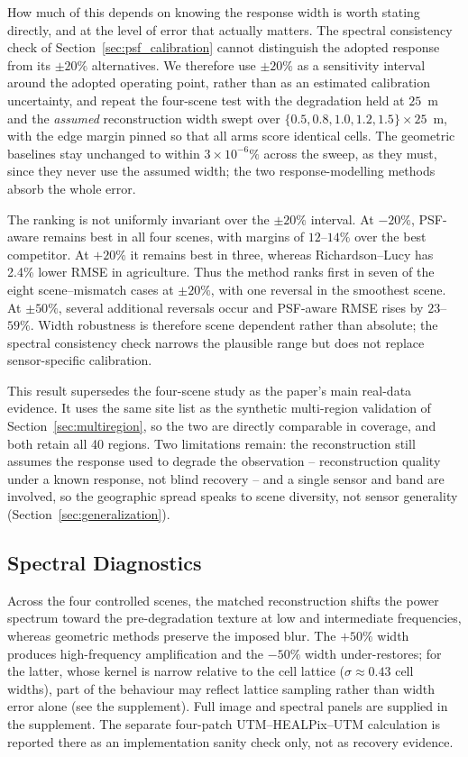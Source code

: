 \documentclass[journal]{IEEEtran}
\newcommand{\healpix}{HEALPix\xspace}
\newcommand{\psf}{PSF\xspace}
\begin{document}
How much of this depends on knowing the response width is worth stating
directly, and at the level of error that actually matters. The spectral
consistency check of Section~\ref{sec:psf_calibration} cannot distinguish the
adopted response from its $\pm20\%$ alternatives. We therefore use $\pm20\%$
as a sensitivity interval around the adopted operating point, rather than as
an estimated calibration uncertainty, and repeat
the four-scene test with the degradation held at $25$~m and the
\emph{assumed} reconstruction width swept over
$\{0.5,0.8,1.0,1.2,1.5\}\times25$~m, with the edge margin pinned so that all
arms score identical cells. The geometric baselines stay unchanged to within
$3\times10^{-6}\%$ across the sweep, as they must, since they never use the
assumed width; the two response-modelling methods absorb the whole error.

The ranking is not uniformly invariant over the $\pm20\%$ interval. At
$-20\%$, \psf-aware remains best in all four scenes, with margins of
$12$--$14\%$ over the best competitor. At $+20\%$ it remains best in three,
whereas Richardson--Lucy has 2.4\% lower RMSE in agriculture. Thus the method
ranks first in seven of the eight scene--mismatch cases at $\pm20\%$, with one
reversal in the smoothest scene. At $\pm50\%$, several additional reversals
occur and \psf-aware RMSE rises by $23$--$59\%$. Width robustness is therefore
scene dependent rather than absolute; the spectral consistency check narrows
the plausible range but does not replace sensor-specific calibration.

This result supersedes the four-scene study as the paper's main real-data
evidence. It uses the same site list as the synthetic multi-region validation
of Section~\ref{sec:multiregion}, so the two are directly comparable in
coverage, and both retain all 40 regions. Two limitations remain: the
reconstruction still assumes the response used to degrade the observation --
reconstruction quality under a known response, not blind recovery -- and a
single sensor and band are involved, so the geographic spread speaks to scene
diversity, not sensor generality (Section~\ref{sec:generalization}).

\subsection{Spectral Diagnostics}
\label{sec:spectral_roundtrip}

Across the four controlled scenes, the matched reconstruction shifts the
power spectrum toward the pre-degradation texture at low and intermediate
frequencies, whereas geometric methods preserve the imposed blur. The
$+50\%$ width produces high-frequency amplification and the $-50\%$ width
under-restores; for the latter, whose kernel is narrow relative to the cell
lattice ($\sigma\approx0.43$ cell widths), part of the behaviour may reflect
lattice sampling rather than width error alone (see the supplement).
Full image and spectral panels are supplied in the supplement.
The separate four-patch UTM--\healpix--UTM calculation is reported there as an
implementation sanity check only, not as recovery evidence.
\end{document}
